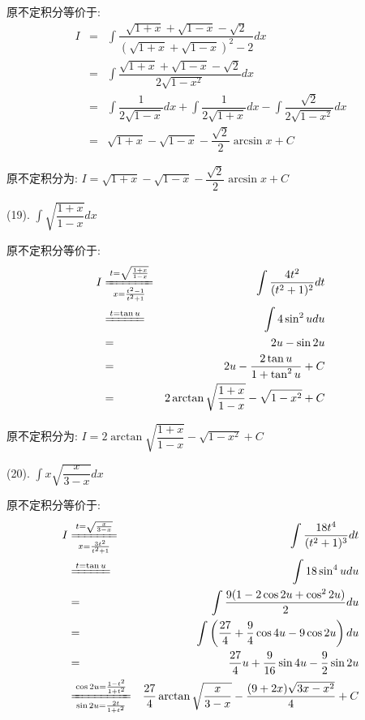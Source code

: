 \begin{anymark}[积分训练]
\begin{solution}
		原不定积分等价于:  
		\begin{eqnarray*}
			I&=&\int \dfrac{\sqrt{1+x}+\sqrt{1-x}-\sqrt{2}}{(\sqrt{1+x}+\sqrt{1-x})^2-2}dx\\
			&=&\int \dfrac{\sqrt{1+x}+\sqrt{1-x}-\sqrt{2}}{2\sqrt{1-x^2}}dx\\
			&=&\int \dfrac{1}{2\sqrt{1-x}}dx+\int \dfrac{1}{2\sqrt{1+x}}dx-\int \dfrac{\sqrt{2}}{2\sqrt{1-x^2}}dx\\
			&=&\sqrt{1+x}-\sqrt{1-x}-\dfrac{\sqrt{2}}{2}\arcsin x+C
		\end{eqnarray*}
		
		原不定积分为:  $I=\sqrt{1+x}-\sqrt{1-x}-\dfrac{\sqrt{2}}{2}\arcsin x+C$
	\end{solution}
	(19). $\int \sqrt{\dfrac{1+x}{1-x}}dx$
	\begin{solution}
		
		原不定积分等价于:  
		\begin{eqnarray*}
			I&\xlongequal[x=\frac{t^2-1}{t^2+1}]{t=\sqrt{\frac{1+x}{1-x}}}&\int\dfrac{4t^2}{(t^2+1)^2}dt\\
			&\xlongequal{t=\tan u}&\int 4\sin^2 udu\\
			&=&2u-\sin2u\\
			&=&2u-\dfrac{2\tan u}{1+\tan^2 u}+C\\
			&=&2\arctan\sqrt{\dfrac{1+x}{1-x}}-\sqrt{1-x^2}+C
		\end{eqnarray*}
		
		原不定积分为:  $I=2\arctan\sqrt{\dfrac{1+x}{1-x}}-\sqrt{1-x^2}+C$
	\end{solution}
	(20). $\int x\sqrt{\dfrac{x}{3-x}}dx$
	\begin{solution}
		
		原不定积分等价于:  
		\begin{eqnarray*}
			I&\xlongequal[x=\frac{3t^2}{t^2+1}]{t=\sqrt{\frac{x}{3-x}}}&\int\dfrac{18t^4}{(t^2+1)^3}dt\\
			&\xlongequal{t=\tan u}&\int 18\sin^4 udu\\
			&=&\int \dfrac{9(1-2\cos 2u+\cos^22u)}{2}du\\
			&=&\int \left( \dfrac{27}{4}+\dfrac{9}{4}\cos 4u-9\cos 2u\right)du\\
			&=&\dfrac{27}{4}u+\dfrac{9}{16}\sin 4u-\dfrac{9}{2}\sin 2u\\
			&\xlongequal[\sin 2u=\frac{2t}{1+t^2}]{\cos 2u=\frac{1-t^2}{1+t^2}}& \dfrac{27}{4}\arctan\sqrt{\dfrac{x}{3-x}}-\dfrac{(9+2x)\sqrt{3x-x^2}}{4}+C
		\end{eqnarray*}
		

\end{solution}
\end{anymark}
